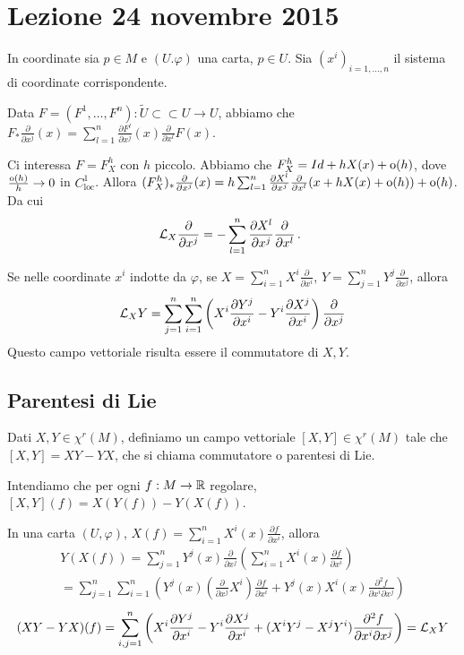 \chapter{Lezione 24 novembre 2015}

In coordinate sia $p\in M$ e $(U.\varphi)$ una carta, $p\in U$. Sia $(x^i)_{i=1,\ldots,n}$ il sistema di coordinate corrispondente.

Data $F=(F^1,\ldots,F^n):\tilde U \subset\subset U \to U$, abbiamo che $F_*\frac\partial{\partial x^j}(x)=\sum_{l=1}^n \frac{\partial F^l}{\partial x^j}(x)\frac\partial{\partial x^l}F(x)$.

Ci interessa $F=F_X^h$ con $h$ piccolo. Abbiamo che $F_X^h=Id+hX(x)+\mathrm{o}(h)$, dove $\frac{\mathrm{o}(h)}{h}\to 0$ in $C^1_{\text{loc}}$.
Allora $(F_X^h)_*\frac\partial{\partial x^j}(x)=h\sum_{l=1}^n \frac{\partial X^l}{\partial x^j}\frac\partial{\partial x^l}(x+hX(x)+\mathrm{o}(h))+\mathrm{o}(h)$.
Da cui
\begin{equation*}
	\mathcal L_X\frac\partial{\partial x^j}=-\sum_{l=1}^n \frac{\partial X^l}{\partial x^j}\frac\partial{\partial x^l}\, \text{. }
\end{equation*}

Se nelle coordinate $x^i$ indotte da $\varphi$, se $X=\sum_{i=1}^n X^i\frac\partial{\partial x^i}$, $Y=\sum_{j=1}^n Y^j\frac\partial{\partial x^j}$, allora
\begin{equation*}
	\mathcal L_XY=\sum_{j=1}^n\sum_{i=1}^n \left(X^i\frac{\partial Y^j}{\partial x^i}-Y^i\frac{\partial X^j}{\partial x^i}\right)\frac\partial{\partial x^j}
\end{equation*}
Questo campo vettoriale risulta essere il commutatore di $X,Y$.

\section{Parentesi di Lie}
\begin{definition}
Dati $X,Y\in\chi^r(M)$, definiamo un campo vettoriale $[X,Y]\in\chi^r(M)$ tale che $[X,Y]=XY-YX$, che si chiama commutatore o parentesi di Lie.

Intendiamo che per ogni $f:M\to\mathbb R$ regolare, $[X,Y](f)=X(Y(f))-Y(X(f))$.
\end{definition}

In una carta $(U,\varphi)$, $X(f)=\sum_{i=1}^n X^i(x)\frac{\partial f}{\partial x^i}$, allora
\begin{multline*}
	Y(X(f))=\sum_{j=1}^nY^j(x)\frac\partial{\partial x^j}\left( \sum_{i=1}^n X^i(x)\frac{\partial f}{\partial x^i} \right)\\
	= \sum_{j=1}^n \sum_{i=1}^n \left( Y^j(x) (\frac{\partial}{\partial x^j}X^i)\frac{\partial f}{\partial x^i} +Y^j(x)X^i(x)\frac{\partial^2 f}{\partial x^i\partial x^j} \right)
\end{multline*}
\begin{equation*}
	(XY-YX)(f)=\sum_{i,j=1}^n\left(X^i\frac{\partial Y^j}{\partial x^i}-Y^i\frac{\partial X^j}{\partial x^i} +(X^iY^j-X^jY^i)\frac{\partial^2 f}{\partial x^i\partial x^j}  \right)=\mathcal L_XY
\end{equation*}

